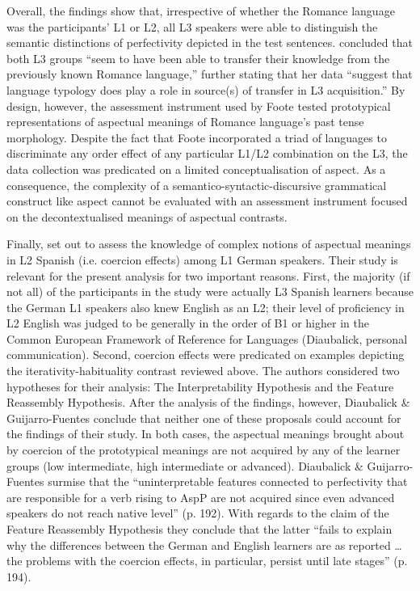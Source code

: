 \documentclass[output=paper,modfonts,nonflat,newtxmath]{langsci/langscibook}
\begin{document}
Overall, the findings show that, irrespective of whether the Romance language was the participants’ L1 or L2, all L3 speakers were able to distinguish the semantic distinctions of perfectivity depicted in the test sentences. \citet[111]{Foote2009} concluded that both L3 groups “seem to have been able to transfer their knowledge from the previously known Romance language,” further stating that her data “suggest that language typology does play a role in source(s) of transfer in L3 acquisition.” By design, however, the assessment instrument used by Foote tested prototypical representations of aspectual meanings of Romance language’s past tense morphology. Despite the fact that Foote incorporated a triad of languages to discriminate any order effect of any particular L1/L2 combination on the L3, the data collection was predicated on a limited conceptualisation of aspect. As a consequence, the complexity of a semantico-syntactic-discursive grammatical construct like aspect cannot be evaluated with an assessment instrument focused on the decontextualised meanings of aspectual contrasts.

Finally, \citet{DiaubalickGuijarro-Fuentes2016} set out to assess the knowledge of complex notions of aspectual meanings in L2 Spanish (i.e. coercion effects) among L1 German speakers. Their study is relevant for the present analysis for two important reasons. First, the majority (if not all) of the participants in the study were actually L3 Spanish learners because the German L1 speakers also knew English as an L2; their level of proficiency in L2 English was judged to be generally in the order of B1 or higher in the Common European Framework of Reference for Languages (Diaubalick, personal communication). Second, coercion effects were predicated on examples depicting the iterativity-habituality contrast reviewed above. The authors considered two hypotheses for their analysis: The Interpretability Hypothesis and the Feature Reassembly Hypothesis. After the analysis of the findings, however, Diaubalick \& Guijarro-Fuentes conclude that neither one of these proposals could account for the findings of their study. In both cases, the aspectual meanings brought about by coercion of the prototypical meanings are not acquired by any of the learner groups (low intermediate, high intermediate or advanced). Diaubalick \& Guijarro-Fuentes surmise that the “uninterpretable features connected to perfectivity that are responsible for a verb rising to AspP are not acquired since even advanced speakers do not reach native level” (p. 192). With regards to the claim of the Feature Reassembly Hypothesis they conclude that the latter “fails to explain why the differences between the German and English learners are as reported … the problems with the coercion effects, in particular, persist until late stages” (p. 194).
\end{document}
